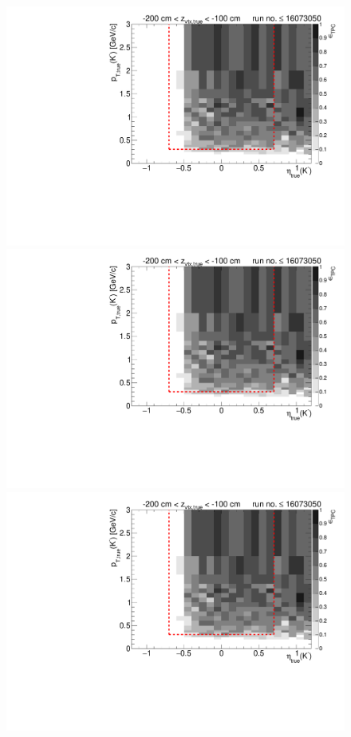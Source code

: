 \begin{figure}[hb]\ContinuedFloat
\centering
\parbox{0.495\textwidth}{
  \centering
  \includegraphics[width=\linewidth,page=11]{graphics/eff/Eff2D_TPC_kaon_Minus_RunRange1.pdf}\\
  \includegraphics[width=\linewidth,page=13]{graphics/eff/Eff2D_TPC_kaon_Minus_RunRange1.pdf}\\
  \includegraphics[width=\linewidth,page=15]{graphics/eff/Eff2D_TPC_kaon_Minus_RunRange1.pdf}\\
}
\end{figure}
